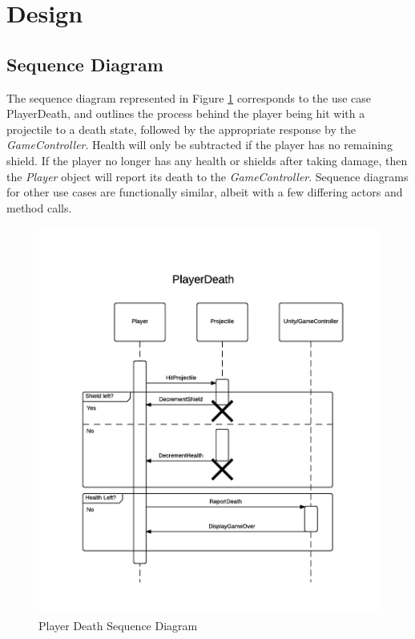 \documentclass[12pt]{article}       %
\begin{document}
\section{Design} %
\label{sec:Design}

\subsection{Sequence Diagram}
The sequence diagram represented in Figure \ref{PlayerDeath}  corresponds to the use case PlayerDeath, and outlines the process behind the player being hit with a projectile to a death state, followed by the appropriate response by the {\it GameController}. Health will only be subtracted if the player has no remaining shield. If the player no longer has any health or shields after taking damage, then the {\it Player} object will report its death to the {\it GameController}. Sequence diagrams for other use cases are functionally similar, albeit with a few differing actors and method calls.

\begin{figure} [H]
\centering
\includegraphics[width=4.75in]{PlayerDeath.png}
\caption{Player Death Sequence Diagram} \label{PlayerDeath}
\end{figure}
\end{document}
